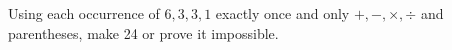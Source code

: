 Using each occurrence of $6,3,3,1$ exactly once and only $+,-,\times,\div$ and parentheses, make 24 or prove it impossible.
